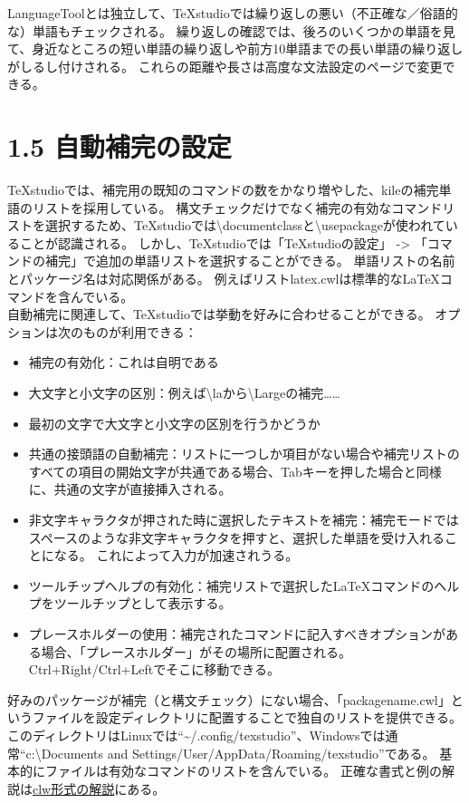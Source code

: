 \documentclass[]{book}
\begin{document}
LanguageToolとは独立して、TeXstudioでは繰り返しの悪い（不正確な／俗語的な）単語もチェックされる。
繰り返しの確認では、後ろのいくつかの単語を見て、身近なところの短い単語の繰り返しや前方10単語までの長い単語の繰り返しがしるし付けされる。
これらの距離や長さは高度な文法設定のページで変更できる。

\section{1.5 自動補完の設定}

TeXstudioでは、補完用の既知のコマンドの数をかなり増やした、kileの補完単語のリストを採用している。
構文チェックだけでなく補完の有効なコマンドリストを選択するため、TeXstudioでは\textbackslash{}documentclassと\textbackslash{}usepackageが使われていることが認識される。
しかし、TeXstudioでは「TeXstudioの設定」 -\textgreater{}
「コマンドの補完」で追加の単語リストを選択することができる。
単語リストの名前とパッケージ名は対応関係がある。
例えばリストlatex.cwlは標準的なLaTeXコマンドを含んでいる。\\
自動補完に関連して、TeXstudioでは挙動を好みに合わせることができる。
オプションは次のものが利用できる：

\begin{itemize}
\item
  補完の有効化：これは自明である
\item
  大文字と小文字の区別：例えば\textbackslash{}laから\textbackslash{}Largeの補完\ldots{}\ldots{}
\item
  最初の文字で大文字と小文字の区別を行うかどうか
\item
  共通の接頭語の自動補完：リストに一つしか項目がない場合や補完リストのすべての項目の開始文字が共通である場合、Tabキーを押した場合と同様に、共通の文字が直接挿入される。
\item
  非文字キャラクタが押された時に選択したテキストを補完：補完モードではスペースのような非文字キャラクタを押すと、選択した単語を受け入れることになる。
  これによって入力が加速されうる。
\item
  ツールチップヘルプの有効化：補完リストで選択したLaTeXコマンドのヘルプをツールチップとして表示する。
\item
  プレースホルダーの使用：補完されたコマンドに記入すべきオプションがある場合、「プレースホルダー」がその場所に配置される。Ctrl+Right/Ctrl+Leftでそこに移動できる。
\end{itemize}

好みのパッケージが補完（と構文チェック）にない場合、「packagename.cwl」というファイルを設定ディレクトリに配置することで独自のリストを提供できる。
このディレクトリはLinuxでは``\textasciitilde{}/.config/texstudio''、Windowsでは通常``c:\textbackslash{}Documents
and Settings/User/AppData/Roaming/texstudio''である。
基本的にファイルは有効なコマンドのリストを含んでいる。
正確な書式と例の解説は\hyperref[CWLDESCRIPTION]{clw形式の解説}にある。
\end{document}
